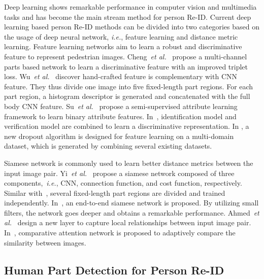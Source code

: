 \documentclass[sigconf]{acmart}
\begin{document}
Deep learning shows remarkable performance in computer vision and multimedia tasks and has become the main stream method for person Re-ID. Current deep learning based person Re-ID methods can be divided into two categories based on the usage of deep neural network, \emph{i.e.}, feature learning and distance metric learning. Feature learning networks aim to learn a robust and discriminative feature to represent pedestrian images. Cheng~\emph{et al.}~\cite{cheng2016person} propose a multi-channel parts based network to learn a discriminative feature with an improved triplet loss. Wu~\emph{et al.}~\cite{wu2016enhanced} discover hand-crafted feature is complementary with CNN feature. They thus divide one image into five fixed-length part regions. For each part region, a histogram descriptor is generated and concatenated with the full body CNN feature. Su~\emph{et al.}~\cite{su2016deep,Su2} propose a semi-supervised attribute learning framework to learn binary attribute features. In~\cite{zheng2016discriminatively}, identification model and verification model are combined to learn a discriminative representation. In \cite{xiao2016learning}, a new dropout algorithm is designed for feature learning on a multi-domain dataset, which is generated by combining several existing datasets.

Siamese network is commonly used to learn better distance metrics between the input image pair. Yi~\emph{et al.}~\cite{yi2014deep} propose a siamese network composed of three components,~\emph{i.e.}, CNN, connection function, and cost function, respectively. Similar with~\cite{cheng2016person}, several fixed-length part regions are divided and trained independently. In~\cite{wu2016personnet}, an end-to-end siamese network is proposed. By utilizing small filters, the network goes deeper and obtains a remarkable performance. Ahmed~\emph{et al.}~\cite{ahmed2015improved} design a new layer to capture local relationships between input image pair. In~\cite{liu2016end}, comparative attention network is proposed to adaptively compare the similarity between images.

\subsection{Human Part Detection for Person Re-ID}
\end{document}
